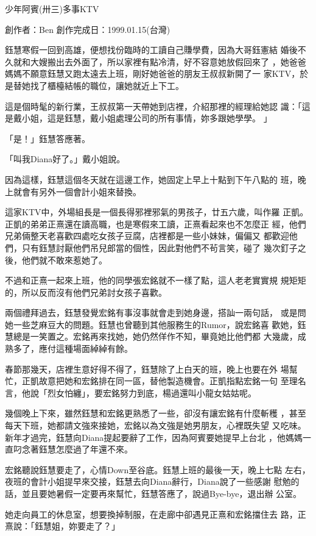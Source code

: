 



少年阿賓(卅三)多事KTV

創作者：Ben
創作完成日：1999.01.15(台灣)


鈺慧寒假一回到高雄，便想找份臨時的工讀自己賺學費，因為大哥鈺憲結
婚後不久就和大嫂搬出去外面了，所以家裡有點冷清，好不容意她放假回來了
，她爸爸媽媽不願意鈺慧又跑太遠去上班，剛好她爸爸的朋友王叔叔新開了一
家KTV，於是替她找了櫃檯結帳的職位，讓她就近上下工。

這是個時髦的新行業，王叔叔第一天帶她到店裡，介紹那裡的經理給她認
識：「這是戴小姐，這是鈺慧，戴小姐處理公司的所有事情，妳多跟她學學。
」

「是！」鈺慧答應著。

「叫我Diana好了。」戴小姐說。

因為這樣，鈺慧這個冬天就在這邊工作，她固定上早上十點到下午八點的
班，晚上就會有另外一個會計小姐來替換。

這家KTV中，外場組長是一個長得邪裡邪氣的男孩子，廿五六歲，叫作羅
正凱。正凱的弟弟正熹還在讀高職，也是寒假來工讀，正熹看起來也不怎麼正
經，他們兄弟倆整天老喜歡四處吃女孩子豆腐，店裡都是一些小妹妹，偏偏又
都歡迎他們，只有鈺慧討厭他們吊兒郎當的個性，因此對他們不茍言笑，碰了
幾次釘子之後，他們就不敢來惹她了。

不過和正熹一起來上班，他的同學張宏銘就不一樣了點，這人老老實實規
規矩矩的，所以反而沒有他們兄弟討女孩子喜歡。

兩個禮拜過去，鈺慧發覺宏銘有事沒事就會走到她身邊，搭訕一兩句話，
或是問她一些芝麻豆大的問題。鈺慧也曾聽到其他服務生的Rumor，說宏銘喜
歡她，鈺慧總是一笑置之。宏銘再來找她，她仍然佯作不知，畢竟她比他們都
大幾歲，成熟多了，應付這種場面綽綽有餘。

春節那幾天，店裡生意好得不得了，鈺慧除了上白天的班，晚上也要在外
場幫忙，正凱故意把她和宏銘排在同一區，替他製造機會。正凱指點宏銘一句
至理名言，他說「烈女怕纏」，要宏銘努力到底，楊過還叫小龍女姑姑呢。

幾個晚上下來，雖然鈺慧和宏銘更熟悉了一些，卻沒有讓宏銘有什麼斬穫
，甚至每天下班，她都請文強來接她，宏銘以為文強是她男朋友，心裡既失望
又吃味。新年才過完，鈺慧向Diana提起要辭了工作，因為阿賓要她提早上台北
，他媽媽一直叼念著鈺慧怎麼過了年還不來。

宏銘聽說鈺慧要走了，心情Down至谷底。鈺慧上班的最後一天，晚上七點
左右，夜班的會計小姐提早來交接，鈺慧去向Diana辭行，Diana說了一些感謝
慰勉的話，並且要她暑假一定要再來幫忙，鈺慧答應了，說過Bye-bye，退出辦
公室。

她走向員工的休息室，想要換掉制服，在走廊中卻遇見正熹和宏銘擋住去
路，正熹說：「鈺慧姐，妳要走了？」

